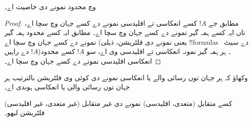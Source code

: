 \documentclass[../../../include/open-logic-section]{subfiles}
\begin{document}
\begin{cor}
   وچ محدود نمونے دی خاصیت اے۔
\end{cor}

\begin{proof}
   مطابق جے $!A$ کسے انعکاسی تے اقلیدسی نمونے دے کسے جہان وچ سچا اے، تاں ایہ کسے ہمہ گیر نمونے دے کسے جہان وچ سچا اے۔
   مطابق ایہ کسے محدود ہمہ گیر نمونے دے کسے جہان وچ سچا اے (یعنی نمونے دی فلٹریشن، ذیلی !!{formula}s دے سیٹ~$!A$ دے راہیں)۔ ہر ہمہ گیر نمونہ انعکاسی تے اقلیدسی وی اے، سو $!A$ کسے محدود انعکاسی اقلیدسی نمونے دے کسے جہان وچ سچا اے۔
\end{proof}

\begin{prob}
  وکھاؤ کہ ہر جہان توں رسائی والے یا انعکاسی نمونے دی کوئی وی فلٹریشن بالترتیب ہر جہان توں رسائی والی یا انعکاسی ہوندی اے۔
\end{prob}

\begin{prob}
  کسے متقابل (متعدی، اقلیدسی) نمونے دی غیر متقابل (غیر متعدی، غیر اقلیدسی) فلٹریشن لبھو۔
\end{prob}
\end{document}
